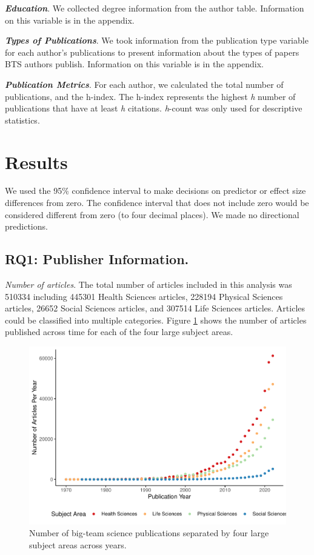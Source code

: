 \documentclass[
  man,floatsintext]{apa6}
\begin{document}
\textbf{\emph{Education}}. We collected degree information from the author table. Information on this variable is in the appendix.

\textbf{\emph{Types of Publications}}. We took information from the
publication type variable for each author's publications to present
information about the types of papers BTS authors publish. Information on this variable is in the appendix.

\textbf{\emph{Publication Metrics}}. For each author, we calculated the total
number of publications, and the h-index. The h-index represents the
highest \emph{h} number of publications that have at least \emph{h} citations. \emph{h}-count was only used for descriptive statistics.

\hypertarget{results}{%
\section{Results}\label{results}}

We used the 95\% confidence interval to make decisions on predictor or effect size differences from zero. The confidence interval that does not include zero would be considered different from zero (to four decimal places). We made no directional predictions.

\hypertarget{rq1-publisher-information.-1}{%
\subsection{RQ1: Publisher Information.}\label{rq1-publisher-information.-1}}

\emph{Number of articles}. The total number of articles included in this analysis was 510334 including 445301 Health Sciences articles, 228194
Physical Sciences articles, 26652 Social Sciences articles, and
307514 Life Sciences articles. Articles could be classified into
multiple categories. Figure \ref{fig:fig-pub-time} shows the number of articles published across time for each of the four large subject areas.

\begin{figure}
\centering
\includegraphics{manuscript_scopus_files/figure-latex/fig-pub-time-1.pdf}
\caption{\label{fig:fig-pub-time}Number of big-team science publications separated by four large subject areas across years.}
\end{figure}
\end{document}
